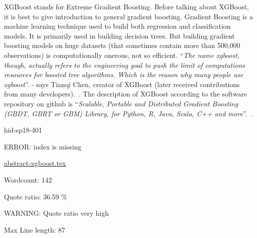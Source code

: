 XGBoost stands for Extreme Gradient Boosting. Before talking about
XGBoost, it is best to give introduction to general gradient
boosting. Gradient Boosting is a machine learning technique used to
build both regression and classification models. It is primarily used
in building decision trees. But building gradient boosting models on
huge datasets (that sometimes contain more than 500,000 observations)
is computationally onerous, not so efficient.  \color{blue}``\emph{The name xgboost,
though, actually refers to the engineering goal to push the limit of
computations resources for boosted tree algorithms. Which is the
reason why many people use xgboost}''\color{black}.  - says Tianqi Chen, creator of
XGBoost (later received contributions from many
developers).~\cite{hid-sp18-401-XGBoost-gen}. The description of
XGBoost according to the software repository on github is \color{blue}``\emph{Scalable,
Portable and Distributed Gradient Boosting (GBDT, GBRT or GBM)
Library, for Python, R, Java, Scala, C++ and
more}''\color{black}.~\cite{hid-sp18-401-XGBoost-git}.


\begin{IU}

hid-sp18-401

ERROR: index is missing

\href{https://github.com/cloudmesh-community/hid-sp18-401/blob/master//technology/abstract-xgboost.tex}{abstract-xgboost.tex}

 

Wordcount: 142


Quote ratio: 36.59 \%

WARNING: Quote ratio very high
 
Max Line length: 87
\end{IU}

